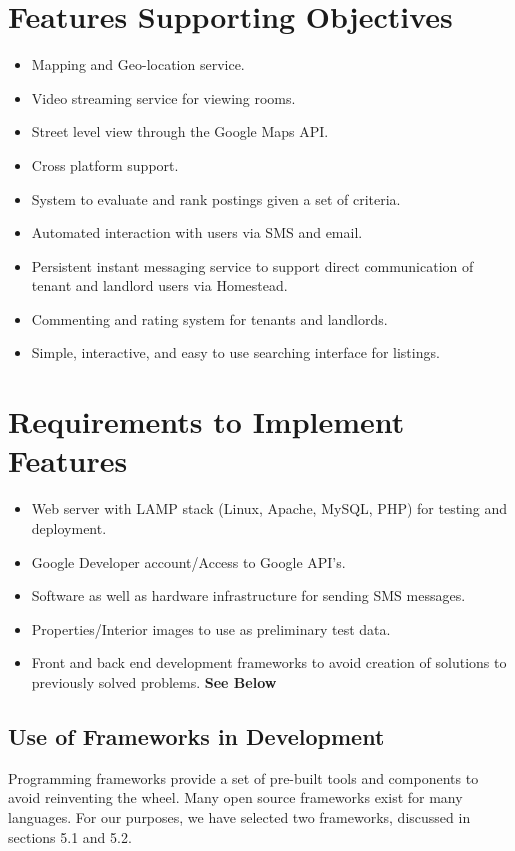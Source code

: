 \documentclass[]{article}
\begin{document}
\section{Features Supporting Objectives}
\begin{itemize}
	\item Mapping and Geo-location service.
	\item Video streaming service for viewing rooms.
	\item Street level view through the Google Maps API.
	\item Cross platform support.
	\item System to evaluate and rank postings given a set of criteria.
	\item Automated interaction with users via SMS and email.
	\item Persistent instant messaging service to support direct communication of tenant and landlord users via Homestead.
	\item Commenting and rating system for tenants and landlords.
	\item Simple, interactive, and easy to use searching interface for listings.
\end{itemize}

\section{Requirements to Implement Features}
\begin{itemize}
	\item Web server with LAMP stack (Linux, Apache, MySQL, PHP) for testing and deployment.
	\item Google Developer account/Access to Google API's.
	\item Software as well as hardware infrastructure for sending SMS messages.
	\item Properties/Interior images to use as preliminary test data.
	\item Front and back end development frameworks to avoid creation of solutions to previously solved problems. \textbf{See Below}
\end{itemize}
\subsection{Use of Frameworks in Development}
Programming frameworks provide a set of pre-built tools and components to avoid reinventing the wheel. Many open source frameworks exist for many languages. For our purposes, we have selected two frameworks, discussed in sections 5.1 and 5.2.
\end{document}
